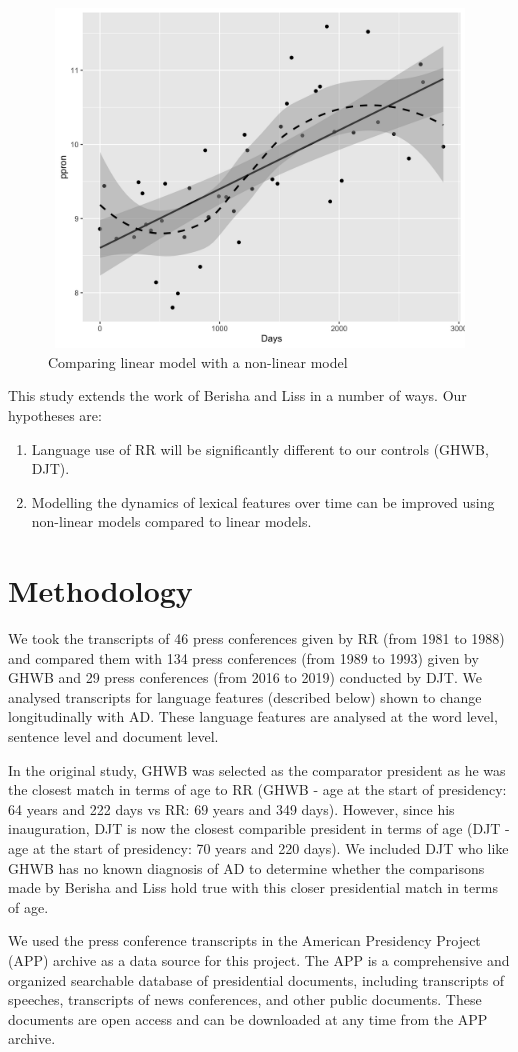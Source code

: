 \documentclass[12pt]{article}
\begin{document}
\begin{figure}[H]
	\centering
	\includegraphics[width=12cm, height=9cm]{plots/comparison1.png}
	\caption{Comparing linear model with a non-linear model}
\end{figure}

This study extends the work of Berisha and Liss in a number of ways. Our hypotheses are:
\begin{enumerate}
	\item Language use of RR will be significantly different to our controls (GHWB, DJT).
	\item Modelling the dynamics of lexical features over time can be improved using non-linear models compared to linear models.
\end{enumerate}

\section{Methodology}\label{methodology}
We took the transcripts of 46 press conferences given by RR (from 1981 to 1988) and compared them with 134 press conferences (from 1989 to 1993) given by GHWB and 29 press conferences (from 2016 to 2019) conducted by DJT.  We analysed transcripts for language features (described below) shown to change longitudinally with AD. These language features are analysed at the word level, sentence level and document level. 
\par 
In the original study, GHWB was selected as the comparator president as he was the closest match in terms of age to RR (GHWB - age at the start of presidency: 64 years and 222 days vs RR: 69 years and 349 days). However, since his inauguration, DJT is now the closest comparible president in terms of age (DJT - age at the start of presidency: 70 years and 220 days). We included DJT who like GHWB has no known diagnosis of AD to determine whether the comparisons made by Berisha and Liss hold true with this closer presidential match in terms of age. 
\par 
We used the press conference transcripts in the American Presidency Project (APP) archive as a data source for this project. The APP is a comprehensive and organized searchable database of presidential documents, including transcripts of speeches, transcripts of news conferences, and other public documents. These documents are open access and can be downloaded at any time from the APP archive.
\end{document}
